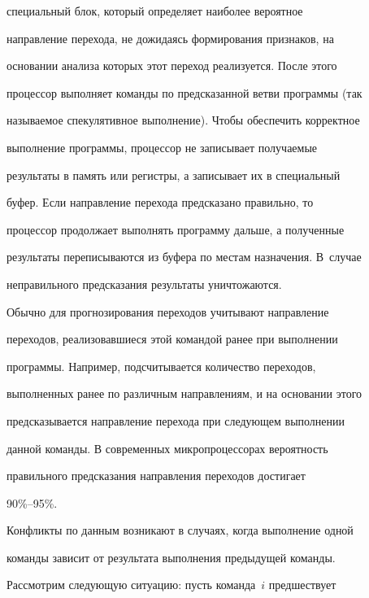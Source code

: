 специальный блок, который определяет наиболее вероятное 


направление перехода, не дожидаясь формирования признаков, на 


основании анализа которых этот переход реализуется. После этого 


процессор выполняет команды по предсказанной ветви программы (так 


называемое спекулятивное выполнение). Чтобы обеспечить корректное 


выполнение программы,  процессор не записывает получаемые 


результаты в память или регистры, а записывает их в специальный 


буфер.  Если направление перехода предсказано правильно, то 


процессор продолжает выполнять программу дальше, а полученные 


результаты переписываются из буфера по местам назначения. В~случае 


неправильного предсказания результаты уничтожаются. 


 


 Обычно для прогнозирования переходов учитывают направление 


переходов, реализовавшиеся этой командой ранее при выполнении 


программы. Например, подсчитывается количество переходов, 


выполненных ранее по различным на\-прав\-лениям, и на основании этого 


предсказывается на\-прав\-ле\-ние перехода при следующем выполнении 


данной команды. В современных микропроцессорах вероятность 


правильного предсказания направления переходов достигает 


 90\%--95\%.   


 { %


 


 }


 


 Конфликты по данным возникают в случаях, когда выполнение одной 


команды зависит от результата выполнения предыдущей команды. 


Рассмотрим следующую ситуацию: пусть команда~$i$ предшествует 


